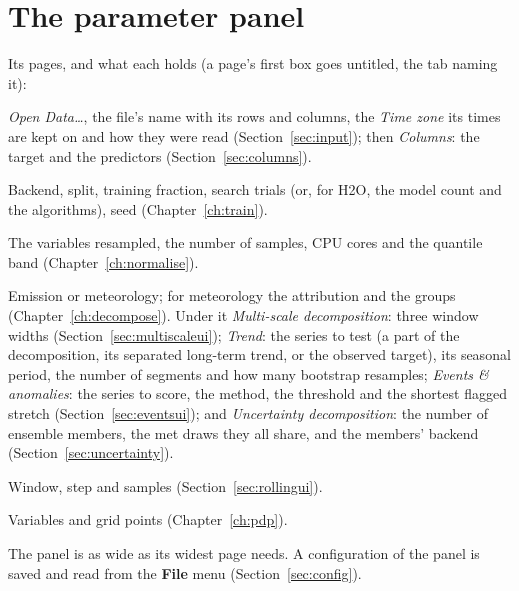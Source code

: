 \documentclass[11pt]{report}
\newcommand{\nosep}{\setlength{\itemsep}{0pt}\setlength{\parskip}{0pt}\setlength{\topsep}{2pt}}
\newcommand{\tab}[1]{\textbf{#1}}
\begin{document}
\section{The parameter panel}
Its pages, and what each holds (a page's first box goes untitled, the tab naming it):
\begin{description}\nosep
  \item[Data] \emph{Open Data\ldots}, the file's name with its rows and columns, the
        \emph{Time zone} its times are kept on and how they were read
        (Section~\ref{sec:input}); then \emph{Columns}: the target and the predictors
        (Section~\ref{sec:columns}).
  \item[Model] Backend, split, training fraction, search trials (or, for H2O, the model
        count and the algorithms), seed (Chapter~\ref{ch:train}).
  \item[Normalise] The variables resampled, the number of samples, CPU cores and the
        quantile band (Chapter~\ref{ch:normalise}).
  \item[Decompose] Emission or meteorology; for meteorology the attribution and the
        groups (Chapter~\ref{ch:decompose}). Under it \emph{Multi-scale decomposition}:
        three window widths (Section~\ref{sec:multiscaleui}); \emph{Trend}: the
        series to test (a part of the decomposition, its separated long-term trend, or
        the observed target), its seasonal period, the number of segments and how
        many bootstrap resamples; \emph{Events \& anomalies}: the series to score,
        the method, the threshold and the shortest flagged stretch
        (Section~\ref{sec:eventsui}); and \emph{Uncertainty decomposition}: the number
        of ensemble members, the met draws they all share, and the members' backend
        (Section~\ref{sec:uncertainty}).
  \item[Rolling] Window, step and samples (Section~\ref{sec:rollingui}).
  \item[PDP] Variables and grid points (Chapter~\ref{ch:pdp}).
\end{description}
The panel is as wide as its widest page needs. A configuration of the panel is saved and
read from the \tab{File} menu (Section~\ref{sec:config}).
\end{document}
